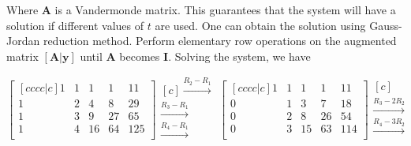 Where $\mathbf{A}$ is a Vandermonde matrix. This guarantees that the system will have a solution if different values of $t$ are used. One can obtain the solution using Gauss-Jordan reduction method. Perform elementary row operations on the augmented matrix $\left[\mathbf{A}|\mathbf{y}\right]$ until $\mathbf{A}$ becomes $\mathbf{I}$. Solving the system, we have

\newcommand\arrows[3]{
	\begin{matrix}[c]
		\ifx\relax#1\relax\else \xrightarrow{#1}\fi\\
		\ifx\relax#2\relax\else \xrightarrow{#2}\fi\\
		\ifx\relax#3\relax\else \xrightarrow{#3}\fi
	\end{matrix}
}

\makeatletter
\renewcommand*\env@matrix[1][*\c@MaxMatrixCols c]{%
	\hskip -\arraycolsep
	\let\@ifnextchar\new@ifnextchar
	\array{#1}}
\makeatother

\begin{equation*}
\begin{bmatrix}[cccc|c]
	1 & 1 & 1 & 1 & 11 \\
	1 & 2 & 4 & 8 & 29 \\
	1 & 3 & 9 & 27 & 65 \\
	1 & 4 & 16 & 64 & 125 \\
\end{bmatrix}
\begin{matrix}[c] 
	\xrightarrow{R_2-R_1} \\
	\xrightarrow{R_3-R_1} \\
	\xrightarrow{R_4-R_1} \\
\end{matrix}
\begin{bmatrix}[cccc|c]
	1 & 1 & 1 & 1 & 11 \\
	0 & 1 & 3 & 7 & 18 \\
	0 & 2 & 8 & 26 & 54 \\
	0 & 3 & 15 & 63 & 114 \\
\end{bmatrix}
\begin{matrix}[c] 
	~ \\
	\xrightarrow{R_3-2R_2} \\
	\xrightarrow{R_4-3R_2} \\
\end{matrix}
\end{equation*}


